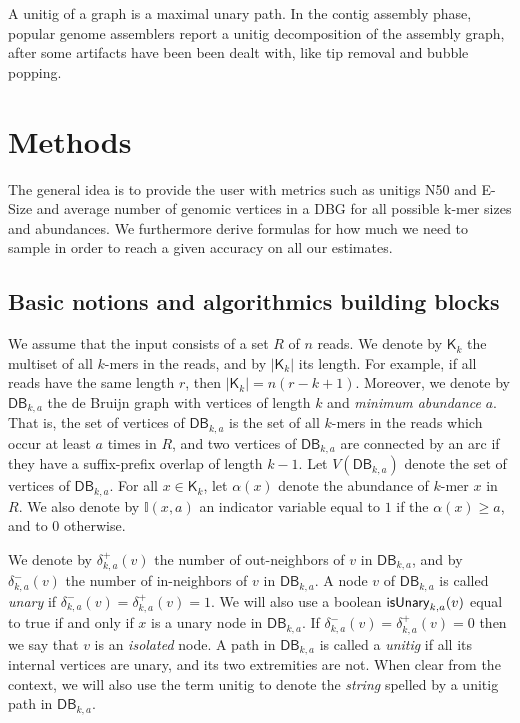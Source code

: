 \documentclass[a4paper,11pt]{article}
\newcommand{\kristoffer}[1]{{\color{red}{#1}}}
\newcommand{\alex}[1]{{\color{blue}{#1}}}
\newcommand{\DB}{\mathsf{DB}_{k,a}}
\newcommand{\dplus}{\delta^+_{k,a}}
\newcommand{\dminus}{\delta^-_{k,a}}
\newcommand{\K}{\mathsf{K}}
\newcommand{\abu}{\alpha}
\newcommand{\isunary}{{\sf isUnary}_{k,a}}
\renewcommand{\geq}{\geqslant}
\begin{document}
A unitig of a graph is a maximal unary path. In the contig assembly phase, popular genome assemblers report a unitig decomposition of the assembly graph, after some artifacts have been been dealt with, like tip removal and bubble popping.



\section{Methods} %
\label{sec:methods}

The general idea is to provide the user with metrics such as unitigs N50 and E-Size and average number of genomic vertices in a DBG  for all possible k-mer sizes and abundances. \kristoffer{ We implement a FM-index data structure described in cite XX. This allows us to query a k-mer, its in and out neighbors in O() time. }  We furthermore derive formulas for how much we need to sample in order to reach a given accuracy on all our estimates. 

\alex{Say that one of the main ideas is to do weighted sampling.}

\alex{Say that we compute for all abundances at the same time.}

\alex{Say that we can query every sampled $k$-mer in parallel.}

\subsection{Basic notions and algorithmics building blocks}

We assume that the input consists of a set $R$ of $n$ reads. We denote by $\K_k$ the multiset of all $k$-mers in the reads, and by $|\K_k|$ its length. For example, if all reads have the same length $r$, then $|\K_k| = n(r-k+1)$. Moreover, we denote by $\DB$ the de Bruijn graph with vertices of length $k$ and \emph{minimum abundance} $a$. That is, the set of vertices of $\DB$ is the set of all $k$-mers in the reads which occur at least $a$ times in $R$, and two vertices of $\DB$ are connected by an arc if they have a suffix-prefix overlap of length $k-1$. Let $V(\DB)$ denote the set of vertices of $\DB$. For all $x \in \K_k$, let $\abu(x)$ denote the abundance of $k$-mer $x$ in $R$. We also denote by $\mathbb{I}(x,a)$ an indicator variable equal to $1$ if the $\abu(x) \geq a$, and to $0$ otherwise.

We denote by $\dplus(v)$ the number of out-neighbors of $v$ in $\DB$, and by $\dminus(v)$ the number of in-neighbors of $v$ in $\DB$. A  node $v$ of $\DB$ is called \emph{unary} if $\dminus(v) = \dplus(v) = 1$. We will also use a boolean $\isunary(v)$ equal to true if and only if $x$ is a unary node in $\DB$. If $\dminus(v) = \dplus(v) = 0$ then we say that $v$ is an \emph{isolated} node. A path in $\DB$ is called a \emph{unitig} if all its internal vertices are unary, and its two extremities are not. When clear from the context, we will also use the term unitig to denote the \emph{string} spelled by a unitig path in $\DB$. 
\end{document}
